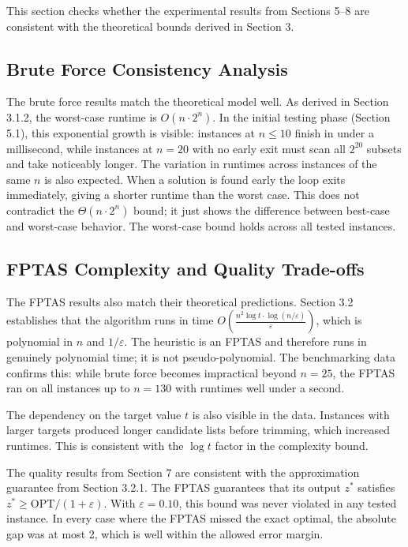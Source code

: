 \documentclass[12pt,a4paper]{article}
\theoremstyle{definition}
\begin{document}
This section checks whether the experimental results from Sections 5--8 are consistent with the theoretical bounds derived in Section 3.

\subsection{Brute Force Consistency Analysis}

The brute force results match the theoretical model well. As derived in Section 3.1.2, the worst-case runtime is $O(n \cdot 2^n)$. In the initial testing phase (Section 5.1), this exponential growth is visible: instances at $n \le 10$ finish in under a millisecond, while instances at $n = 20$ with no early exit must scan all $2^{20}$ subsets and take noticeably longer. The variation in runtimes across instances of the same $n$ is also expected. When a solution is found early the loop exits immediately, giving a shorter runtime than the worst case. This does not contradict the $\Theta(n \cdot 2^n)$ bound; it just shows the difference between best-case and worst-case behavior. The worst-case bound holds across all tested instances.

\subsection{FPTAS Complexity and Quality Trade-offs}

The FPTAS results also match their theoretical predictions. Section 3.2 establishes that the algorithm runs in time $O\left(\frac{n^2 \log t \cdot \log(n/\varepsilon)}{\varepsilon}\right)$, which is polynomial in $n$ and $1/\varepsilon$. The heuristic is an FPTAS and therefore runs in genuinely polynomial time; it is not pseudo-polynomial. The benchmarking data confirms this: while brute force becomes impractical beyond $n = 25$, the FPTAS ran on all instances up to $n = 130$ with runtimes well under a second.

The dependency on the target value $t$ is also visible in the data. Instances with larger targets produced longer candidate lists before trimming, which increased runtimes. This is consistent with the $\log t$ factor in the complexity bound.

The quality results from Section 7 are consistent with the approximation guarantee from Section 3.2.1. The FPTAS guarantees that its output $z^*$ satisfies $z^* \ge \mathrm{OPT}/(1+\varepsilon)$. With $\varepsilon = 0.10$, this bound was never violated in any tested instance. In every case where the FPTAS missed the exact optimal, the absolute gap was at most 2, which is well within the allowed error margin.
\end{document}
